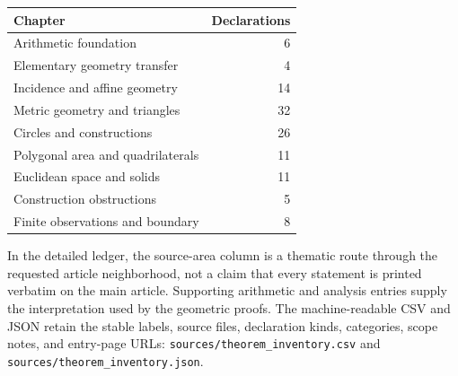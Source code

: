 \begin{center}\small\begin{tabular}{@{}lr@{}}
\toprule Chapter & Declarations\\\midrule
Arithmetic foundation & 6\\
Elementary geometry transfer & 4\\
Incidence and affine geometry & 14\\
Metric geometry and triangles & 32\\
Circles and constructions & 26\\
Polygonal area and quadrilaterals & 11\\
Euclidean space and solids & 11\\
Construction obstructions & 5\\
Finite observations and boundary & 8\\
\bottomrule\end{tabular}\end{center}

In the detailed ledger, the source-area column is a thematic route
through the requested article neighborhood, not a claim that every
statement is printed verbatim on the main article. Supporting arithmetic
and analysis entries supply the interpretation used by the geometric
proofs. The machine-readable CSV and JSON retain the stable labels,
source files, declaration kinds, categories, scope notes, and entry-page
URLs: \texttt{sources/theorem\_inventory.csv} and
\texttt{sources/theorem\_inventory.json}.


